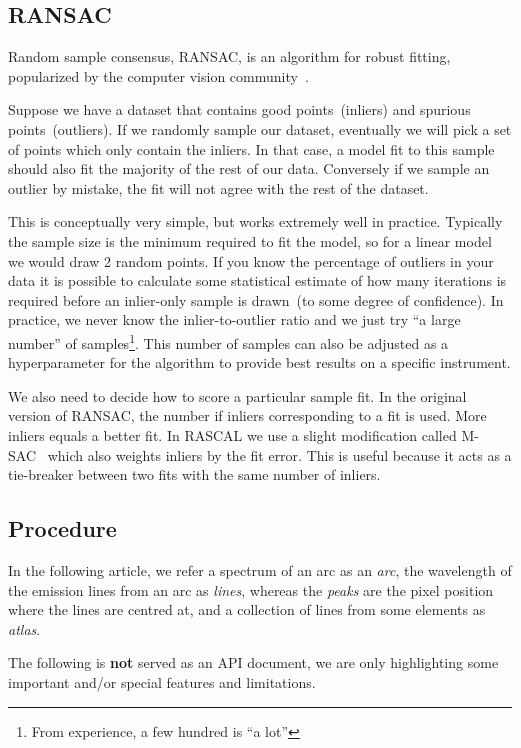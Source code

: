 \documentclass{aa}
\begin{document}
\subsection{RANSAC}
Random sample consensus, RANSAC, is an algorithm for robust fitting,
popularized by the computer vision community~\citep{fischler_bolles_1981}.

Suppose we have a dataset that contains good points~(inliers) and spurious
points~(outliers). If we randomly sample our dataset, eventually we will
pick a set of points which only contain the inliers. In that case, a model
fit to this sample should also fit the majority of the rest of our data.
Conversely if we sample an outlier by mistake, the fit will not agree with
the rest of the dataset.

This is conceptually very simple, but works extremely well in practice.
Typically the sample size is the minimum required to fit the model, so for
a linear model we would draw 2 random points. If you know the percentage of
outliers in your data it is possible to calculate some statistical estimate
of how many iterations is required before an inlier-only sample is drawn~(to
some degree of confidence). In practice, we never know the inlier-to-outlier
ratio and we just try ``a large number'' of samples\footnote{From experience,
a few hundred is ``a lot''}. This number of samples can also be adjusted as 
a hyperparameter for the algorithm to provide best results on a specific
instrument.

We also need to decide how to score a particular sample fit. In the original
version of RANSAC, the number if inliers corresponding to a fit is used. More
inliers equals a better fit. In RASCAL we use a slight modification called
M-SAC~\citep{Torr00mlesac:a} which also weights inliers by the fit error.
This is useful because it acts as a tie-breaker between two fits with the
same number of inliers.

\subsection{Procedure}
In the following article, we refer a spectrum of an arc as an \textit{arc},
the wavelength of the emission lines from an arc as \textit{lines}, whereas 
the \textit{peaks} are the pixel position where the lines are centred at,
and a collection of lines from some elements as \textit{atlas}.

The following is \textbf{not} served as an API document, we are only highlighting
some important and/or special features and limitations.
\end{document}
